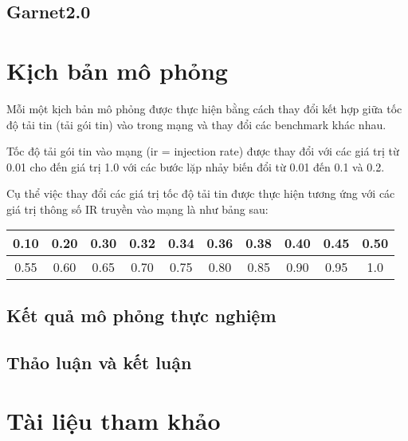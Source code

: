 \documentclass{article}
\begin{document}
\subsection{Garnet2.0}


\section{Kịch bản mô phỏng}

Mỗi một kịch bản mô phỏng được thực hiện bằng cách thay đổi kết hợp giữa tốc độ tải tin (tải gói tin) vào trong mạng và thay đổi các benchmark khác nhau. 

Tốc độ tải gói tin vào mạng (ir = injection rate) được thay đổi với các giá trị từ 0.01 cho đến giá trị 1.0 với các bước lặp nhảy biến đổi từ 0.01 đến 0.1 và 0.2.

Cụ thể việc thay đổi các giá trị tốc độ tải tin được thực hiện tương ứng với các giá trị thông số IR truyền vào mạng là như bảng sau:

\begin{center}
\begin{tabular}{|c|c|c|c|c|c|c|c|c|c|}
	\hline
	0.10 & 0.20  &0.30  &0.32  &0.34  &0.36  &0.38  &0.40  &0.45  &0.50  \\ 
	\hline
	0.55 & 0.60  &0.65  &0.70  &0.75  &0.80  &0.85  &0.90  &0.95  &1.0 \\
	\hline
\end{tabular} 
\end{center}
\subsection{Kết quả mô phỏng thực nghiệm}
\subsection{Thảo luận và kết luận}

\section{Tài liệu tham khảo}


	\newpage
	
	
	
\end{document}

